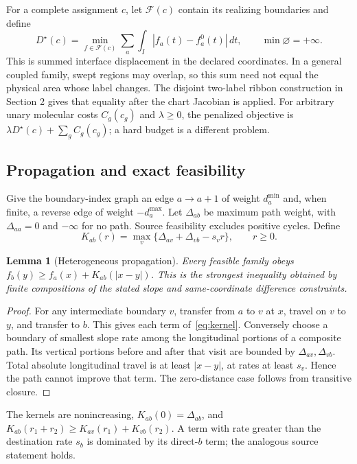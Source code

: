\documentclass[10pt,letterpaper]{article}
\newcommand{\F}{\mathcal F}
\newtheorem{lemma}[proposition]{Lemma}
\begin{document}
For a complete assignment $c$, let $\F(c)$ contain its realizing boundaries and define
\begin{equation}
D^\star(c)=\min_{f\in\F(c)}\sum_a\int_I |f_a(t)-f_a^0(t)|\,dt,
\qquad \min\varnothing=+\infty.\label{eq:dstar}
\end{equation}
This is summed interface displacement in the declared coordinates. In a general coupled family, swept regions may overlap, so this sum need not equal the physical area whose label changes. The disjoint two-label ribbon construction in Section 2 gives that equality after the chart Jacobian is applied. For arbitrary unary molecular costs $C_g(c_g)$ and $\lambda\ge0$, the penalized objective is $\lambda D^\star(c)+\sum_g C_g(c_g)$; a hard budget is a different problem.

\FloatBarrier
\subsection{Propagation and exact feasibility}
Give the boundary-index graph an edge $a\to a+1$ of weight $d_a^{\min}$ and, when finite, a reverse edge of weight $-d_a^{\max}$. Let $\Delta_{ab}$ be maximum path weight, with $\Delta_{aa}=0$ and $-\infty$ for no path. Source feasibility excludes positive cycles. Define
\begin{equation}
K_{ab}(r)=\max_v\{\Delta_{av}+\Delta_{vb}-s_v r\},\qquad r\ge0.\label{eq:kernel}
\end{equation}
\begin{lemma}[Heterogeneous propagation]\label{lem:kernel}
Every feasible family obeys $f_b(y)\ge f_a(x)+K_{ab}(|x-y|)$. This is the strongest inequality obtained by finite compositions of the stated slope and same-coordinate difference constraints.
\end{lemma}
\begin{proof}
For any intermediate boundary $v$, transfer from $a$ to $v$ at $x$, travel on $v$ to $y$, and transfer to $b$. This gives each term of~\eqref{eq:kernel}. Conversely choose a boundary of smallest slope rate among the longitudinal portions of a composite path. Its vertical portions before and after that visit are bounded by $\Delta_{av},\Delta_{vb}$. Total absolute longitudinal travel is at least $|x-y|$, at rates at least $s_v$. Hence the path cannot improve that term. The zero-distance case follows from transitive closure.
\end{proof}
The kernels are nonincreasing, $K_{ab}(0)=\Delta_{ab}$, and $K_{ab}(r_1+r_2)\ge K_{av}(r_1)+K_{vb}(r_2)$. A term with rate greater than the destination rate $s_b$ is dominated by its direct-$b$ term; the analogous source statement holds.
\end{document}
